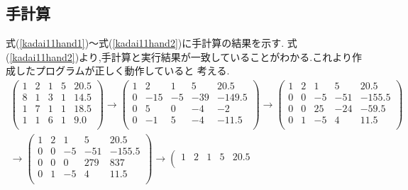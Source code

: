 \documentclass[a4j]{jarticle}
\begin{document}
      \subsection{手計算}
      式(\ref{kadai11hand1})～式(\ref{kadai11hand2})に手計算の結果を示す.
      式(\ref{kadai11hand2})より,手計算と実行結果が一致していることがわかる.これより作成したプログラムが正しく動作していると
      考える.
      \begin{eqnarray}
        \left(
          \begin{array}{cccc|c}
            1 & 2 & 1 & 5 & 20.5 \\
            8 & 1 & 3 & 1 & 14.5 \\
            1 & 7 & 1 & 1 & 18.5 \\
            1 & 1 & 6 & 1 & 9.0 \\ 
          \end{array}
        \right)
        \rightarrow
        \left(
          \begin{array}{cccc|c}
            1 & 2 & 1 & 5 & 20.5 \\
            0 & -15 & -5 & -39 & -149.5 \\
            0 & 5 & 0 & -4 & -2 \\
            0 & -1 & 5 & -4 & -11.5 \\ 
          \end{array}
        \right) 
        \rightarrow
        \left(
          \begin{array}{cccc|c}
            1 & 2 & 1 & 5 & 20.5 \\
            0 & 0 & -5 & -51 & -155.5 \\
            0 & 0 & 25 & -24 & -59.5 \\
            0 & 1 & -5 & 4 & 11.5 \\ 
          \end{array}
        \right) \label{kadai11hand1} \\
        \rightarrow
        \left(
          \begin{array}{cccc|c}
            1 & 2 & 1 & 5 & 20.5 \\
            0 & 0 & -5 & -51 & -155.5 \\
            0 & 0 & 0 & 279 & 837 \\
            0 & 1 & -5 & 4 & 11.5 \\ 
          \end{array}
        \right)
        \rightarrow
        \left(
          \begin{array}{cccc|c}
            1 & 2 & 1 & 5 & 20.5 \\

\end{array}
\end{eqnarray}
\end{document}
